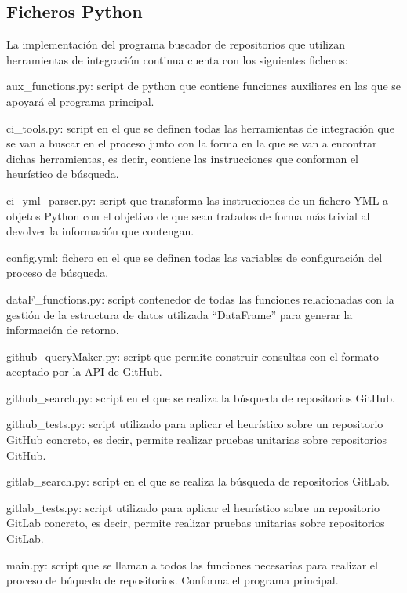 \subsection{Ficheros Python}
La implementación del programa buscador de repositorios que utilizan herramientas de integración continua cuenta con los siguientes ficheros:
\begin{compactitem}
    \item aux\_functions.py: script de python que contiene funciones auxiliares en las que se apoyará el programa principal.
    \item ci\_tools.py: script en el que se definen todas las herramientas de integración que se van a buscar en el proceso junto con la forma en la que se van a encontrar dichas herramientas, es decir, contiene las instrucciones que conforman el heurístico de búsqueda.
    \item ci\_yml\_parser.py: script que transforma las instrucciones de un fichero YML a objetos Python con el objetivo de que sean tratados  de forma más trivial al devolver la información que contengan.
    \item config.yml: fichero en el que se definen todas las variables de configuración del proceso de búsqueda.
    \item dataF\_functions.py: script contenedor de todas las funciones relacionadas con la gestión de la estructura de datos utilizada ``DataFrame'' para generar la información de retorno.
    \item github\_queryMaker.py: script que permite construir consultas con el formato aceptado por la API de GitHub.
    \item github\_search.py: script en el que se realiza la búsqueda de repositorios GitHub.
    \item github\_tests.py: script utilizado para aplicar el heurístico sobre un repositorio GitHub concreto, es decir, permite realizar pruebas unitarias sobre repositorios GitHub.
    \item gitlab\_search.py: script en el que se realiza la búsqueda de repositorios GitLab.
    \item gitlab\_tests.py: script utilizado para aplicar el heurístico sobre un repositorio GitLab concreto, es decir, permite realizar pruebas unitarias sobre repositorios GitLab.
    \item main.py: script que se llaman a todos las funciones necesarias para realizar el proceso de búqueda de repositorios. Conforma el programa principal.
\end{compactitem}

